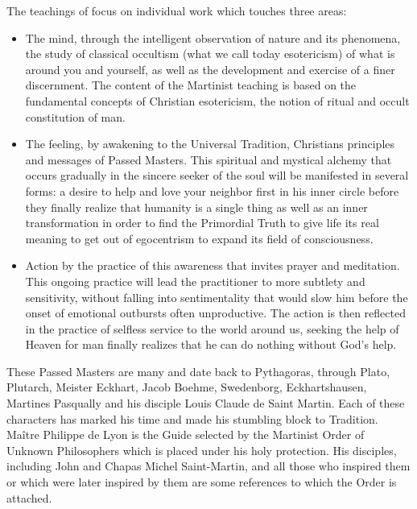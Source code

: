 
The teachings of \moup{} focus on individual work which touches three areas:
\begin{itemize}
    \item The mind, through the intelligent observation of nature and its phenomena, the
study of classical occultism (what we call today esotericism) of what is around you
and yourself, as well as the development and exercise of a finer discernment. The
content of the Martinist teaching is based on the fundamental concepts of Christian
esotericism, the notion of ritual and occult constitution of man.
    \item The feeling, by awakening to the Universal Tradition, Christians principles and
messages of Passed Masters. This spiritual and mystical alchemy that occurs
gradually in the sincere seeker of the soul will be manifested in several forms: a
desire to help and love your neighbor first in his inner circle before they finally
realize that humanity is a single thing as well as an inner transformation in order to
find the Primordial Truth to give life its real meaning to get out of egocentrism to
expand its field of consciousness.
    \item Action by the practice of this awareness that invites prayer and meditation. This
ongoing practice will lead the practitioner to more subtlety and sensitivity, without
falling into sentimentality that would slow him before the onset of emotional
outbursts often unproductive. The action is then reflected in the practice of selfless
service to the world around us, seeking the help of Heaven for man finally realizes
that he can do nothing without God's help.
\end{itemize}


These Passed Masters are many and date back to Pythagoras, through Plato, Plutarch,
Meister Eckhart, Jacob Boehme, Swedenborg, Eckhartshausen, Martines Pasqually and his
disciple Louis Claude de Saint Martin. Each of these characters has marked his time and
made his stumbling block to Tradition. Maître Philippe de Lyon is the Guide selected by the
Martinist Order of Unknown Philosophers which is placed under his holy protection.
His disciples, including John and Chapas Michel Saint-Martin, and all those who inspired
them or which were later inspired by them are some references to which the Order is
attached.

